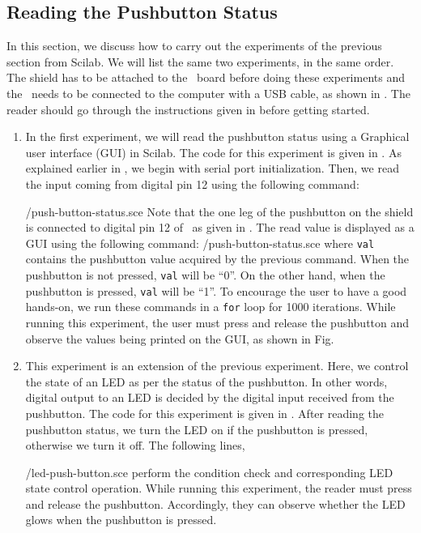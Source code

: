 \subsection{Reading the Pushbutton Status}
In this section, we discuss how to carry out the experiments of the
previous section from Scilab. We will list the same two experiments,
in the same order.  The shield has to be attached to the \arduino\ board
before doing these experiments and the \arduino\ needs to be connected to the computer 
with a USB cable, as shown in .
The reader should go through the instructions given in
 before getting started. 
\begin{enumerate}
\item In the first experiment, we will read the pushbutton status using a 
Graphical user interface (GUI) in Scilab. The code for this experiment is 
given in  . As explained earlier in , 
we begin with serial port initialization. Then, we read the input coming from
digital pin 12 using the following command: 
  
  {\LocPushscicode/push-button-status.sce} Note that the one leg of the pushbutton on
  the shield is connected to digital pin 12 of \arduino\, 
  as given in . The read value is displayed as a GUI using
  the following command: 
  {\LocPushscicode/push-button-status.sce} where {\tt val} contains
  the pushbutton value acquired by the previous command.
  When the pushbutton is not pressed, {\tt val} will be ``0''. On the other hand,
  when the pushbutton is pressed, {\tt val} will be ``1''. To
  encourage the user to have a good hands-on, we run these commands in
  a {\tt for} loop for 1000 iterations. While running this experiment, 
  the user must press and release the pushbutton and observe the values being printed on the
  GUI, as shown in Fig.

\item This experiment is an extension of the previous
  experiment. Here, we control the state of an LED as per the status
  of the pushbutton. In other words, digital output to an LED is
  decided by the digital input received from the pushbutton. The code
  for this experiment is given in . After reading
  the pushbutton status, we turn the LED on if the pushbutton is
  pressed, otherwise we turn it off. The following lines,
  
  {\LocPushscicode/led-push-button.sce} perform the condition check
  and corresponding LED state control operation. While running this experiment, the reader 
  must press and release the pushbutton. Accordingly, they can observe whether 
  the LED glows when the pushbutton is pressed. 
\end{enumerate}

